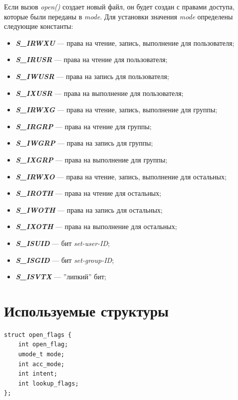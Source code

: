 Если вызов \textit{open()} создает новый файл, он будет создан с правами доступа, которые были переданы в \textit{mode}.
Для установки значения \textit{mode} определены следующие константы:
\begin{itemize}
	\item \textit{\textbf{S\_IRWXU}} --- права на чтение, запись, выполнение для пользователя;
	\item \textit{\textbf{S\_IRUSR}} --- права на чтение для пользователя;
	\item \textit{\textbf{S\_IWUSR}} --- права на запись для пользователя;
	\item \textit{\textbf{S\_IXUSR}} --- права на выполнение для пользователя;
	\item \textit{\textbf{S\_IRWXG}} --- права на чтение, запись, выполнение для группы;
	\item \textit{\textbf{S\_IRGRP}} --- права на чтение для группы;
	\item \textit{\textbf{S\_IWGRP}} --- права на запись для группы;
	\item \textit{\textbf{S\_IXGRP}} --- права на выполнение для группы;
	\item \textit{\textbf{S\_IRWXO}} --- права на чтение, запись, выполнение для остальных;
	\item \textit{\textbf{S\_IROTH}} --- права на чтение для остальных;
	\item \textit{\textbf{S\_IWOTH}} --- права на запись для остальных;
	\item \textit{\textbf{S\_IXOTH}} --- права на выполнение для остальных;
	\item \textit{\textbf{S\_ISUID}} --- бит \textit{set-user-ID};
	\item \textit{\textbf{S\_ISGID}} --- бит \textit{set-group-ID};
	\item \textit{\textbf{S\_ISVTX}} --- ''липкий'' бит;
\end{itemize}

\chapter{Используемые структуры}


\begin{lstlisting}[caption={Структура open\_flags}]
struct open_flags {
	int open_flag;
	umode_t mode;
	int acc_mode;
	int intent;
	int lookup_flags;
};
\end{lstlisting}

